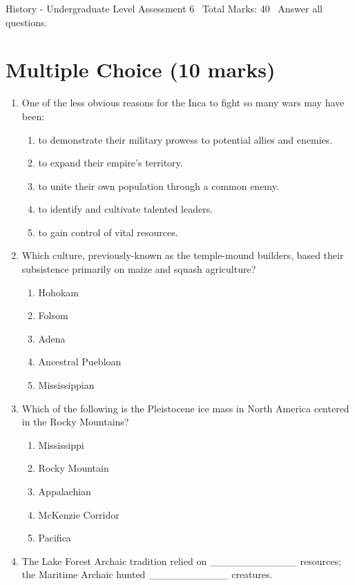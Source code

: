 \documentclass[12pt]{article}
\begin{document}
\begin{center}
History - Undergraduate Level Assessment 6 \
Total Marks: 40 \
Answer all questions.
\end{center}

\section*{Multiple Choice (10 marks)}
\begin{enumerate}[label=\arabic*.]
\item One of the less obvious reasons for the Inca to fight so many wars may have been:
\begin{enumerate}[label=(\alph*)]
    \item to demonstrate their military prowess to potential allies and enemies.
    \item to expand their empire's territory.
    \item to unite their own population through a common enemy.
    \item to identify and cultivate talented leaders.
    \item to gain control of vital resources.
\end{enumerate}
\item Which culture, previously-known as the temple-mound builders, based their subsistence primarily on maize and squash agriculture?
\begin{enumerate}[label=(\alph*)]
    \item Hohokam
    \item Folsom
    \item Adena
    \item Ancestral Puebloan
    \item Mississippian
\end{enumerate}
\item Which of the following is the Pleistocene ice mass in North America centered in the Rocky Mountains?
\begin{enumerate}[label=(\alph*)]
    \item Mississippi
    \item Rocky Mountain
    \item Appalachian
    \item McKenzie Corridor
    \item Pacifica
\end{enumerate}
\item The Lake Forest Archaic tradition relied on \_\_\_\_\_\_\_\_\_\_\_\_ resources; the Maritime Archaic hunted \_\_\_\_\_\_\_\_\_\_\_ creatures.

\end{enumerate}
\end{document}
